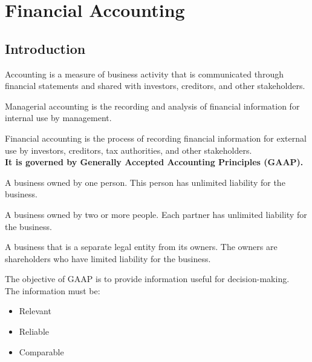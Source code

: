 \chapter{Financial Accounting}

\section{Introduction}

\begin{definition}
    [Accounting]
    Accounting is a measure of business activity that is communicated through financial statements and shared with investors, creditors, and other stakeholders.
\end{definition}

\begin{definition}
    Managerial accounting is the recording and analysis of financial information for internal use by management.
\end{definition}

\begin{definition}
    Financial accounting is the process of recording financial information for external use by investors, creditors, tax authorities, and other stakeholders.\\
    \textbf{It is governed by Generally Accepted Accounting Principles (GAAP).}
\end{definition}

\begin{definition}
    [Proprietorship]
    A business owned by one person. This person has unlimited liability for the business.
\end{definition}

\begin{definition}
    [Partnership]
    A business owned by two or more people. Each partner has unlimited liability for the business.
\end{definition}

\begin{definition}
    [Corporation]
    A business that is a separate legal entity from its owners. The owners are shareholders who have limited liability for the business.
\end{definition}

\begin{definition}
    The objective of GAAP is to provide information useful for decision-making.\\
    The information must be:
    \begin{itemize}
        \item Relevant
        \item Reliable
        \item Comparable
    \end{itemize}
\end{definition}


